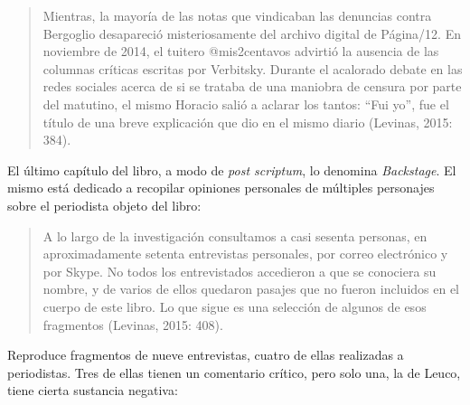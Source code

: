 \begin{quote}
Mientras, la mayoría de las notas que vindicaban las denuncias contra Bergoglio desapareció misteriosamente del archivo digital de Página/12. En noviembre de 2014, el tuitero @mis2centavos advirtió la ausencia de las columnas críticas escritas por Verbitsky. Durante el acalorado debate en las redes sociales acerca de si se trataba de una maniobra de censura por parte del matutino, el mismo Horacio salió a aclarar los tantos: ``Fui yo'', fue el título de una breve explicación que dio en el mismo diario (Levinas, 2015: 384).
\end{quote}

El último capítulo del libro, a modo de \emph{post scriptum}, lo denomina \emph{Backstage}. El mismo está dedicado a recopilar opiniones personales de múltiples personajes sobre el periodista objeto del libro:

\begin{quote}
A lo largo de la investigación consultamos a casi sesenta personas, en aproximadamente setenta entrevistas personales, por correo electrónico y por Skype. No todos los entrevistados accedieron a que se conociera su nombre, y de varios de ellos quedaron pasajes que no fueron incluidos en el cuerpo de este libro. Lo que sigue es una selección de algunos de esos fragmentos (Levinas, 2015: 408).
\end{quote}

Reproduce fragmentos de nueve entrevistas, cuatro de ellas realizadas a periodistas. Tres de ellas tienen un comentario crítico, pero solo una, la de Leuco, tiene cierta sustancia negativa:

